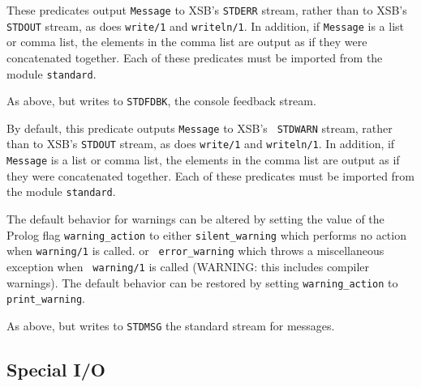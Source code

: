 \begin{description}

%
These predicates output {\tt Message} to XSB's {\tt STDERR} stream,
rather than to XSB's {\tt STDOUT} stream, as does {\tt write/1} and
{\tt writeln/1}.  In addition, if {\tt Message} is a list or comma
list, the elements in the comma list are output as if they were
concatenated together.  Each of these predicates must be imported from
the module {\tt standard}.

%
As above, but writes to {\tt STDFDBK}, the console feedback stream.

%
By default, this predicate outputs {\tt Message} to XSB's {\tt
  STDWARN} stream, rather than to XSB's {\tt STDOUT} stream, as does
{\tt write/1} and {\tt writeln/1}.  In addition, if {\tt Message} is a
list or comma list, the elements in the comma list are output as if
they were concatenated together.  Each of these predicates must be
imported from the module {\tt standard}.

The default behavior for warnings can be altered by setting the value
of the Prolog flag {\tt warning\_action} to either {\tt silent\_warning}
which performs no action when {\tt warning/1} is called. or {\tt
  error\_warning} which throws a miscellaneous exception when {\tt
  warning/1} is called (WARNING: this includes compiler warnings).
The default behavior can be restored by setting {\tt warning\_action}
to {\tt print\_warning}.

%
As above, but writes to {\tt STDMSG} the standard stream for messages.

\end{description}

\subsection{Special I/O}


